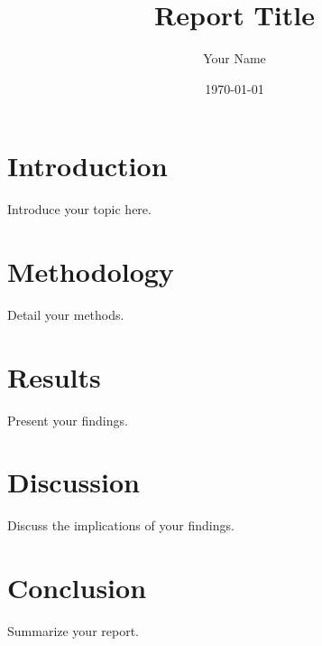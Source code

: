\documentclass[a4paper,12pt]{report}
\title{Report Title}
\author{Your Name}
\date{\today}
\begin{document}
\maketitle

\tableofcontents

\chapter{Introduction}
Introduce your topic here.

\chapter{Methodology}
Detail your methods.

\chapter{Results}
Present your findings.

\chapter{Discussion}
Discuss the implications of your findings.

\chapter{Conclusion}
Summarize your report.
\end{document}
